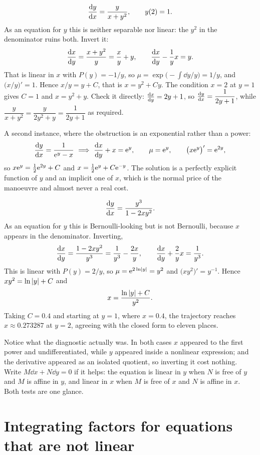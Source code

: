 \begin{worked}
\[\frac{\mathrm{d}y}{\mathrm{d}x}=\frac{y}{x+y^{2}},\qquad y(2)=1.\]
As an equation for $y$ this is neither separable nor linear: the $y^{2}$ in the denominator ruins both. Invert it:
\[\frac{\mathrm{d}x}{\mathrm{d}y}=\frac{x+y^{2}}{y}=\frac{x}{y}+y,\qquad \frac{\mathrm{d}x}{\mathrm{d}y}-\frac{1}{y}x=y.\]
That is linear in $x$ with $P(y)=-1/y$, so $\mu=\exp\bigl(-\int\dd y/y\bigr)=1/y$, and $\bigl(x/y\bigr)'=1$. Hence $x/y=y+C$, that is $x=y^{2}+Cy$. The condition $x=2$ at $y=1$ gives $C=1$ and $x=y^{2}+y$. Check it directly: $\frac{\mathrm{d}x}{\mathrm{d}y}=2y+1$, so $\frac{\mathrm{d}y}{\mathrm{d}x}=\dfrac{1}{2y+1}$, while $\dfrac{y}{x+y^{2}}=\dfrac{y}{2y^{2}+y}=\dfrac{1}{2y+1}$ as required.

A second instance, where the obstruction is an exponential rather than a power:
\[\dv{y}{x}=\frac{1}{\eu^{y}-x}\ \Longrightarrow\ \dv{x}{y}+x=\eu^{y},\qquad \mu=\eu^{y},\qquad \bigl(x\eu^{y}\bigr)'=\eu^{2y},\]
so $x\mathrm{e}^{y}=\tfrac12\mathrm{e}^{2y}+C$ and $x=\tfrac12\mathrm{e}^{y}+C\mathrm{e}^{-y}$. The solution is a perfectly explicit function of $y$ and an implicit one of $x$, which is the normal price of the manoeuvre and almost never a real cost.
\end{worked}

\begin{worked}
\[\frac{\mathrm{d}y}{\mathrm{d}x}=\frac{y^{3}}{1-2xy^{2}}.\]
As an equation for $y$ this is Bernoulli-looking but is not Bernoulli, because $x$ appears in the denominator. Inverting,
\[\frac{\mathrm{d}x}{\mathrm{d}y}=\frac{1-2xy^{2}}{y^{3}}=\frac{1}{y^{3}}-\frac{2x}{y},\qquad \frac{\mathrm{d}x}{\mathrm{d}y}+\frac{2}{y}x=\frac{1}{y^{3}}.\]
This is linear with $P(y)=2/y$, so $\mu=\mathrm{e}^{2\ln\left\lvert y\right\rvert}=y^{2}$ and $\bigl(xy^{2}\bigr)'=y^{-1}$. Hence $xy^{2}=\ln\left\lvert y\right\rvert+C$ and
\[x=\frac{\ln\left\lvert y\right\rvert+C}{y^{2}}.\]
Taking $C=0.4$ and starting at $y=1$, where $x=0.4$, the trajectory reaches $x\approx0.273287$ at $y=2$, agreeing with the closed form to eleven places.
\end{worked}

Notice what the diagnostic actually was. In both cases $x$ appeared to the first power and undifferentiated, while $y$ appeared inside a nonlinear expression; and the derivative appeared as an isolated quotient, so inverting it cost nothing. Write $M\dd x+N\dd y=0$ if it helps: the equation is linear in $y$ when $N$ is free of $y$ and $M$ is affine in $y$, and linear in $x$ when $M$ is free of $x$ and $N$ is affine in $x$. Both tests are one glance.

\section{Integrating factors for equations that are not linear}

